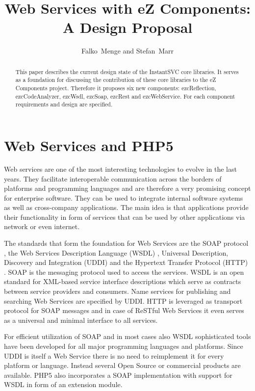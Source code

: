 \documentclass[10pt,final,a4paper,oneside]{article}
\begin{document}
\title{Web Services with eZ Components:\\ A Design Proposal}
\author{Falko~Menge and Stefan~Marr}

\maketitle


\begin{abstract}
This paper describes the current design state
of the InstantSVC core libraries.
It serves as a foundation for discussing the contribution
of these core libraries to the eZ Components project.
Therefore it proposes six new components:
ezcReflection, ezcCodeAnalyzer, ezcWsdl, ezcSoap, ezcRest and ezcWebService.
For each component requirements and design are specified.
\end{abstract}

\section{Web Services and PHP5}\label{sec:Introduction}
Web services are one of the most interesting technologies to evolve in the
last years. They facilitate interoperable communication across the borders of 
platforms and programming languages and are therefore a very 
promising concept for enterprise software. They can be used to integrate 
internal software systems as well as cross-company applications. The main idea is that 
applications provide their functionality in form of services that can be 
used by other applications via network or even internet. 

The standards that form the foundation for Web Services are the SOAP
protocol \cite{SOAP}, the Web Services Description Language (WSDL) \cite{WSDL},
Universal Description, Discovery and Integration (UDDI) \cite{UDDI} and the
Hypertext Transfer Protocol (HTTP) \cite{HTTP}.
SOAP is the messaging protocol used to access the services. WSDL is an
open standard for XML-based service interface descriptions which serve as
contracts between service providers and consumers. Name services for
publishing and searching Web Services are specified by UDDI. HTTP is
leveraged as transport protocol for SOAP messages and in case of ReSTful
Web Services it even serves as a universal and minimal interface to all
services.

For efficient utilization of SOAP and in most cases also WSDL
sophisticated tools have been developed for all major programming
languages and platforms.
Since UDDI is itself a Web Service there is no need
to reimplement it for every platform or language.
Instead several Open Source or commercial products are available.
PHP5 also incorporates a SOAP implementation with support for WSDL
in form of an extension module.
\end{document}
